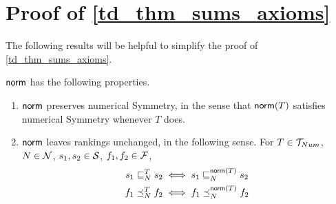 \section{Proof of \cref{td_thm_sums_axioms}}

The following results will be helpful to simplify the proof of
\cref{td_thm_sums_axioms}.

\begin{lemma}
\label{td_lemma_norm_properties}
$\norm$ has the following properties.
\begin{enumerate}
    \item $\norm$ preserves numerical Symmetry, in the sense that $\norm(T)$
          satisfies numerical Symmetry whenever $T$ does.
    \item $\norm$ leaves rankings unchanged, in the following sense. For $T \in
          \num$, $N \in \N$, $s_1, s_2 \in \S$, $f_1, f_2 \in \F$,
          \begin{align*}
              s_1 \sle_N^T s_2 & \iff s_1 \sle_N^{\norm(T)} s_2 \\
              f_1 \fle_N^T f_2 & \iff f_1 \fle_N^{\norm(T)} f_2
          \end{align*}
\end{enumerate}
\end{lemma}

